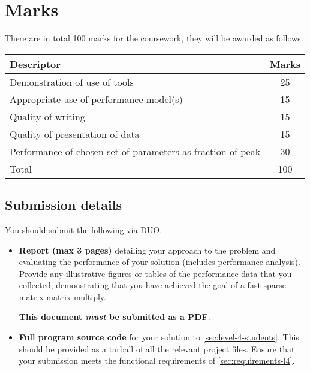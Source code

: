 \documentclass[a4paper]{article}
\begin{document}
\section{Marks}
\label{sec:marks}

There are in total 100 marks for the coursework, they
will be awarded as follows:

\begin{center}
  \renewcommand\tabularxcolumn[1]{m{#1}}
  \begin{tabularx}{0.9\linewidth}{Xc}
    \toprule
    Descriptor                                                  & Marks \\
    \midrule
    Demonstration of use of tools                               & 25    \\
    Appropriate use of performance model(s)                     & 15    \\
    Quality of writing                                          & 15    \\
    Quality of presentation of data                             & 15    \\
    \midrule
    Performance of chosen set of parameters as fraction of peak & 30    \\
    \midrule
    Total                                                       & 100   \\
    \bottomrule
  \end{tabularx}
\end{center}

\subsection{Submission details}
\label{sec:submission}

You should submit the following via DUO.
\begin{itemize}
\item \textbf{Report (max 3 pages)}
  detailing your approach to the problem and evaluating the
  performance of your solution (includes performance analysis).
  Provide any illustrative figures or tables of the performance data
  that you collected, demonstrating that you have achieved the goal of
  a fast sparse matrix-matrix multiply.

  \textbf{This document \emph{must} be submitted as a PDF}.

\item \textbf{Full program source code} for your solution to
  \cref{sec:level-4-students}.  This should be provided as a tarball
  of all the relevant project files.  Ensure that your submission
  meets the functional requirements of \cref{sec:requirements-l4}.
\end{itemize}
\printbibliography
\end{document}
